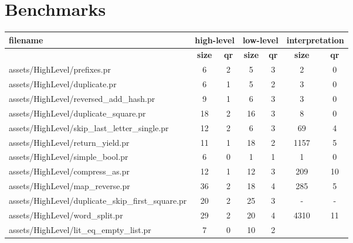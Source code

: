 \section{Benchmarks}
\label{sec:benchmarks}

\begin{tabular}{l|c|c|c|c|c|c}
    \toprule
    \textbf{filename} & \multicolumn{2}{c|}{\textbf{high-level}} & \multicolumn{2}{c|}{\textbf{low-level}} & \multicolumn{2}{c|}{\textbf{interpretation}} \\
    \midrule
                      & \textbf{size} & \textbf{qr} & \textbf{size} & \textbf{qr} & \textbf{size} & \textbf{qr} \\
    \midrule
            assets/HighLevel/prefixes.pr &
        6 & 2 &
         5 & 3  &
         2 & 0  \\
            assets/HighLevel/duplicate.pr &
        6 & 1 &
         5 & 2  &
         3 & 0  \\
            assets/HighLevel/reversed\_add\_hash.pr &
        9 & 1 &
         6 & 3  &
         3 & 0  \\
            assets/HighLevel/duplicate\_square.pr &
        18 & 2 &
         16 & 3  &
         8 & 0  \\
            assets/HighLevel/skip\_last\_letter\_single.pr &
        12 & 2 &
         6 & 3  &
         69 & 4  \\
            assets/HighLevel/return\_yield.pr &
        11 & 1 &
         18 & 2  &
         1157 & 5  \\
            assets/HighLevel/simple\_bool.pr &
        6 & 0 &
         1 & 1  &
         1 & 0  \\
            assets/HighLevel/compress\_as.pr &
        12 & 1 &
         12 & 3  &
         209 & 10  \\
            assets/HighLevel/map\_reverse.pr &
        36 & 2 &
         18 & 4  &
         285 & 5  \\
            assets/HighLevel/duplicate\_skip\_first\_square.pr &
        20 & 2 &
         25 & 3  &
         - & -  \\
            assets/HighLevel/word\_split.pr &
        29 & 2 &
         20 & 4  &
         4310 & 11  \\
            assets/HighLevel/lit\_eq\_empty\_list.pr &
        7 & 0 &
         10 & 2  &

\end{tabular}
